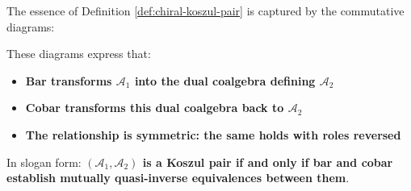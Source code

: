 \begin{remark}\label{rem:koszul-relationship}
The essence of Definition \ref{def:chiral-koszul-pair} is captured by the commutative diagrams:

\begin{center}
\qquad
{}
\end{center}

These diagrams express that:
\begin{itemize}
\item \textbf{Bar transforms $\mathcal{A}_1$ into the dual coalgebra defining $\mathcal{A}_2$}
\item \textbf{Cobar transforms this dual coalgebra back to $\mathcal{A}_2$}
\item \textbf{The relationship is symmetric: the same holds with roles reversed}
\end{itemize}

In slogan form: \textbf{$(\mathcal{A}_1, \mathcal{A}_2)$ is a Koszul pair if and only if bar and cobar establish mutually quasi-inverse equivalences between them}.
\end{remark}

